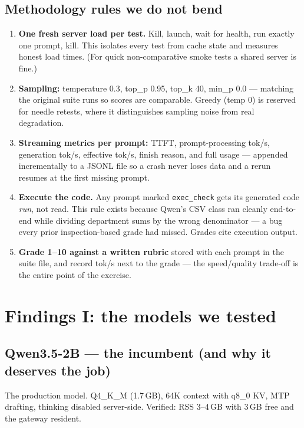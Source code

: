 \documentclass[11pt,a4paper]{article}
\begin{document}
\subsection{Methodology rules we do not bend}

\begin{enumerate}[leftmargin=1.6em,itemsep=2pt]
  \item \textbf{One fresh server load per test.} Kill, launch, wait for
        health, run exactly one prompt, kill. This isolates every test from
        cache state and measures honest load times. (For quick
        non-comparative smoke tests a shared server is fine.)
  \item \textbf{Sampling:} temperature 0.3, top\_p 0.95, top\_k 40,
        min\_p 0.0 --- matching the original suite runs so scores are
        comparable. Greedy (temp 0) is reserved for needle retests, where it
        distinguishes sampling noise from real degradation.
  \item \textbf{Streaming metrics per prompt:} TTFT, prompt-processing
        tok/s, generation tok/s, effective tok/s, finish reason, and full
        usage --- appended incrementally to a JSONL file so a crash never
        loses data and a rerun resumes at the first missing prompt.
  \item \textbf{Execute the code.} Any prompt marked \texttt{exec\_check}
        gets its generated code \emph{run}, not read. This rule exists
        because Qwen's CSV class ran cleanly end-to-end while dividing
        department sums by the wrong denominator --- a bug every prior
        inspection-based grade had missed. Grades cite execution output.
  \item \textbf{Grade 1--10 against a written rubric} stored with each
        prompt in the suite file, and record tok/s next to the grade ---
        the speed/quality trade-off is the entire point of the exercise.
\end{enumerate}

\section{Findings I: the models we tested}
\label{sec:findings}

\subsection{Qwen3.5-2B --- the incumbent (and why it deserves the job)}
\label{sec:qwen}

The production model. Q4\_K\_M (1.7\,GB), 64K context with q8\_0 KV, MTP
drafting, thinking disabled server-side. Verified: RSS 3--4\,GB with 3\,GB
free and the gateway resident.
\end{document}

